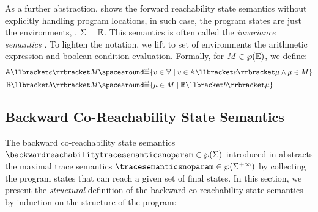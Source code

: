 As a further abstraction,  shows the forward reachability state semantics without explicitly handling program locations, in such case, the program states are just the environments, \ie, $\Sigma = \mathbb{E}$. This semantics is often called the \emph{invariance semantics} .
To lighten the notation, we lift to set of environments the arithmetic expression and boolean condition evaluation.
Formally, for $M\in\wp(\mathbb{E})$, we define:
\begin{align*}
  \aexpsemantics\defsetofenvs &\DefeQ \setdef{\defvalue\in\values}{\defvalue\in\aexpsemanticsnoparam\semanticsof{\defaexp}\defenv \land \defenv\in\defsetofenvs} \\
  \bexpsemantics \defsetofenvs &\DefeQ \setdef{\defenv\in\defsetofenvs}{\bexpsemantics\defenv}
\end{align*}




\subsection{Backward Co-Reachability State Semantics}

The backward co-reachability state semantics $\backwardreachabilitytracesemanticsnoparam\in\backwardreachabilitytracetype$ introduced in  abstracts the maximal trace semantics $\tracesemanticsnoparam\in\tracetype$ by collecting the program states that can reach a given set of final states. In this section, we present the \emph{structural} definition of the backward co-reachability state semantics by induction on the structure of the program:


